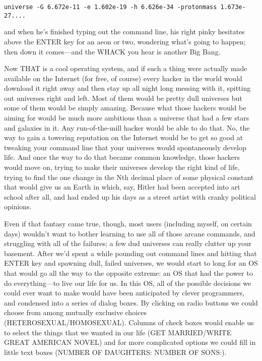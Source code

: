 \documentclass[
  fontsize=11pt,
  paper=landscape,
  twocolumn=true,
  pagesize=pdftex,
  headings=small,
  DIV=15,
  ]{scrartcl}
\begin{document}
\begin{lstlisting}
universe -G 6.672e-11 -e 1.602e-19 -h 6.626e-34 -protonmass 1.673e-27....
\end{lstlisting}
and when he's finished typing out the command line, his right pinky
hesitates above the ENTER key for an aeon or two, wondering what's going
to happen; then down it comes---and the WHACK you hear is another Big
Bang.

Now THAT is a cool operating system, and if such a thing were actually
made available on the Internet (for free, of course) every hacker in the
world would download it right away and then stay up all night long
messing with it, spitting out universes right and left. Most of them
would be pretty dull universes but some of them would be simply amazing.
Because what those hackers would be aiming for would be much more
ambitious than a universe that had a few stars and galaxies in it. Any
run-of-the-mill hacker would be able to do that. No, the way to gain a
towering reputation on the Internet would be to get so good at tweaking
your command line that your universes would spontaneously develop life.
And once the way to do that became common knowledge, those hackers would
move on, trying to make their universes develop the right kind of life,
trying to find the one change in the Nth decimal place of some physical
constant that would give us an Earth in which, say, Hitler had been
accepted into art school after all, and had ended up his days as a
street artist with cranky political opinions.

Even if that fantasy came true, though, most users (including myself, on
certain days) wouldn't want to bother learning to use all of those
arcane commands, and struggling with all of the failures; a few dud
universes can really clutter up your basement. After we'd spent a while
pounding out command lines and hitting that ENTER key and spawning dull,
failed universes, we would start to long for an OS that would go all the
way to the opposite extreme: an OS that had the power to do
everything---to live our life for us. In this OS, all of the possible
decisions we could ever want to make would have been anticipated by
clever programmers, and condensed into a series of dialog boxes. By
clicking on radio buttons we could choose from among mutually exclusive
choices (HETEROSEXUAL/HOMOSEXUAL). Columns of check boxes would enable
us to select the things that we wanted in our life (GET MARRIED/WRITE
GREAT AMERICAN NOVEL) and for more complicated options we could fill in
little text boxes (NUMBER OF DAUGHTERS: NUMBER OF SONS:).
\end{document}
